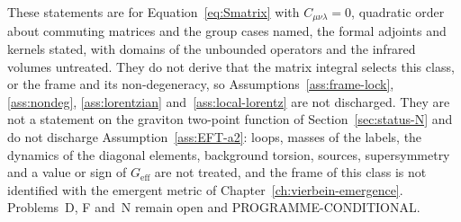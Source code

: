 These statements are for Equation~\eqref{eq:Smatrix} with \(C_{\mu\nu\lambda}=0\), quadratic order about commuting matrices and the group cases named, the formal adjoints and kernels stated, with domains of the unbounded operators and the infrared volumes untreated. They do not derive that the matrix integral selects this class, or the frame and its non-degeneracy, so Assumptions~\ref{ass:frame-lock}, \ref{ass:nondeg}, \ref{ass:lorentzian} and~\ref{ass:local-lorentz} are not discharged. They are not a statement on the graviton two-point function of Section~\ref{sec:status-N} and do not discharge Assumption~\ref{ass:EFT-a2}: loops, masses of the labels, the dynamics of the diagonal elements, background torsion, sources, supersymmetry and a value or sign of \(G_{\mathrm{eff}}\) are not treated, and the frame of this class is not identified with the emergent metric of Chapter~\ref{ch:vierbein-emergence}. Problems~D, F and~N remain open and PROGRAMME-CONDITIONAL.

